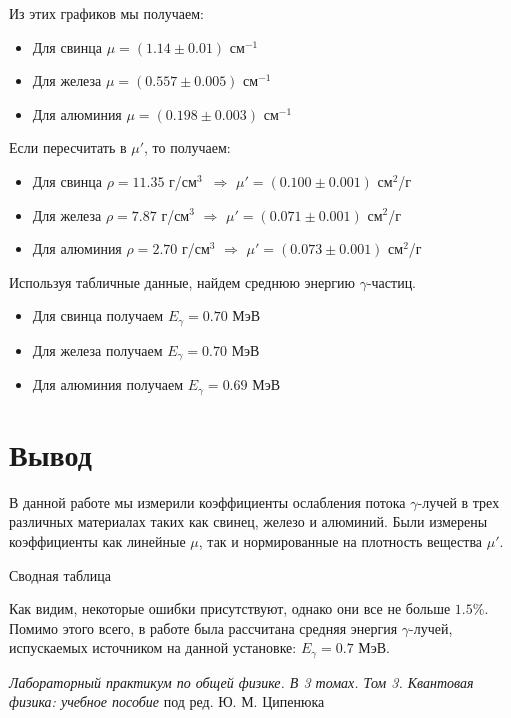 \documentclass[12pt,a4paper]{article}
\begin{document}
 Из этих графиков мы получаем:
	\begin{itemize}
		\item Для свинца $\mu = (1.14 \pm 0.01)$ см$^{-1}$
		
		\item Для железа $\mu = (0.557 \pm 0.005)$ см$^{-1}$
		
		\item Для алюминия $\mu = (0.198 \pm 0.003)$ см$^{-1}$
	\end{itemize}
	Если пересчитать в $\mu'$, то получаем:
	\begin{itemize}
		\item Для свинца $\rho = 11.35$ г/см$^3$ \;\;\;\,$\Longrightarrow$ $\mu' = (0.100 \pm 0.001)$ см$^2$/г
		
		\item Для железа $\rho = 7.87$ г/см$^3$ \;\;\;\;\;$\Longrightarrow$ $\mu' = (0.071 \pm 0.001)$ см$^2$/г
		
		\item Для алюминия $\rho = 2.70$ г/см$^3$ $\Longrightarrow$ $\mu' = (0.073 \pm 0.001)$ см$^2$/г
	\end{itemize}

	Используя табличные данные, найдем среднюю энергию $\gamma$-частиц.
	
	\begin{itemize}
		\item Для свинца получаем $E_\gamma = 0.70$ МэВ 
		
		\item Для железа получаем $E_\gamma = 0.70$ МэВ
		
		\item Для алюминия получаем $E_\gamma = 0.69$ МэВ
	\end{itemize}


    \clearpage
    
	\section*{Вывод}
 
    В данной работе мы измерили коэффициенты ослабления потока $\gamma$-лучей в трех различных материалах таких как свинец, железо и алюминий. Были измерены коэффициенты как линейные $\mu$, так и нормированные на плотность вещества $\mu'$.

    \begin{table}[h!]
        \centering
        
        \caption{Сводная таблица}
   \end{table}
 
	Как видим, некоторые ошибки присутствуют, однако они все не больше $1.5\%$. Помимо этого всего, в работе была рассчитана средняя энергия $\gamma$-лучей, испускаемых источником на данной установке: $E_\gamma = 0.7$ МэВ.

    \vfill

    \begin{thebibliography}{9}
    	 \emph{Лабораторный практикум по общей физике. В 3 томах. Том 3. Квантовая физика: учебное пособие} под ред. Ю. М. Ципенюка
    \end{thebibliography}
\end{document}
